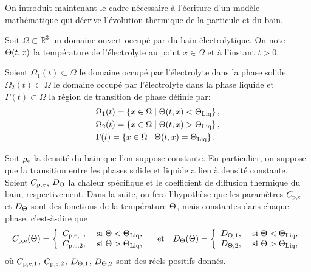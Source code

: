 On introduit maintenant le cadre nécessaire à l'écriture d'un modèle
mathématique qui décrive l'évolution thermique de la particule et du
bain.

Soit $\Omega\subset \mathbb R^3$ un domaine ouvert occupé par du bain
électrolytique. On note $\Theta(t, x)$ la température de
l'électrolyte au point $x \in \Omega$ et à l'instant $t > 0$.

Soient $\Omega_1(t)\subset \Omega$ le domaine occupé par l'électrolyte
dans la phase solide, $\Omega_2(t)\subset \Omega$ le domaine occupé
par l'électrolyte dans la phase liquide et $\Gamma(t) \subset \Omega$
la région de transition de phase définie par:
\begin{align}\label{eq:phase-domains}
  &\Omega_1(t) = \cparent{x\in\Omega \mid %
                         \temperature(t, x) < \tliq},\\
  &\Omega_2(t) = \cparent{x\in\Omega \mid \temperature(t, x) %
    > \tliq},\\
  &\Gamma(t) = \cparent{x\in\Omega\mid \temperature(t, x) = \tliq}.
\end{align}

Soit $\rho_\mathrm{e}$ la densité du bain que l'on suppose
constante. En particulier, on suppose que la transition entre les
phases solide et liquide a lieu à densité constante.
Soient $C_{\mathrm{p,e}}$, $D_\Theta$ la chaleur
spécifique et le coefficient de diffusion thermique du bain,
respectivement. Dans la suite, on fera l'hypothèse que les paramètres
$C_{\mathrm{p,e}}$ et $D_\Theta$ sont des fonctions de la
température $\Theta$, mais constantes dans chaque phase,
c'est-à-dire que
\begin{equation}
  C_{\mathrm{p,e}}(\Theta) = \left\{
  \begin{array}{ll}
    C_{\mathrm{p,e,1}}, & \text{ si } \Theta < \Theta_\text{Liq},\\
    C_{\mathrm{p,e,2}}, & \text{ si } \Theta > \Theta_\text{Liq},
  \end{array}
  \right.
  \quad\text{et}\quad
  D_\Theta(\Theta) = \left\{
  \begin{array}{ll}
    D_{\Theta,\mathrm{1}}, & \text{ si } \Theta < \Theta_\text{Liq},\\
    D_{\Theta,\mathrm{2}}, & \text{ si } \Theta > \Theta_\text{Liq},
  \end{array}
  \right.
\end{equation}
où $C_{\mathrm{p,e,1}}$, $C_{\mathrm{p,e,2}}$, $D_{\Theta,\mathrm{1}}$,
$D_{\Theta,\mathrm{2}}$ sont des réels positifs donnés.

